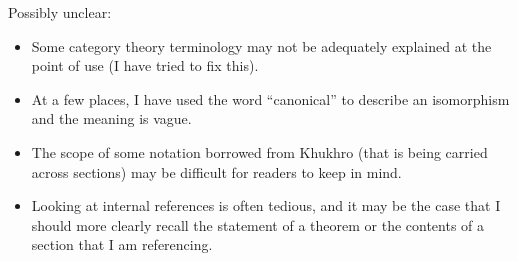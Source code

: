 \documentclass[10pt]{amsart}
\begin{document}
Possibly unclear:

\begin{itemize}
\item Some category theory terminology may not be adequately explained
  at the point of use (I have tried to fix this).
\item At a few places, I have used the word ``canonical'' to describe
  an isomorphism and the meaning is vague.
\item The scope of some notation borrowed from Khukhro (that is being
  carried across sections) may be difficult for readers to keep in mind.
\item Looking at internal references is often tedious, and it may be
  the case that I should more clearly recall the statement of a
  theorem or the contents of a section that I am referencing.
\end{itemize}
\end{document}
